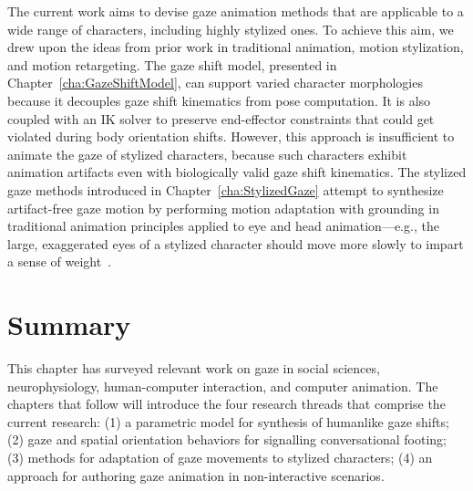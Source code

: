 The current work aims to devise gaze animation methods that are applicable to a wide range of characters, including highly stylized ones. To achieve this aim, we drew upon the ideas from prior work in traditional animation, motion stylization, and motion retargeting. The gaze shift model, presented in Chapter~\ref{cha:GazeShiftModel}, can support varied character morphologies because it decouples gaze shift kinematics from pose computation. It is also coupled with an IK solver to preserve end-effector constraints that could get violated during body orientation shifts. However, this approach is insufficient to animate the gaze of stylized characters, because such characters exhibit animation artifacts even with biologically valid gaze shift kinematics. The stylized gaze methods introduced in Chapter~\ref{cha:StylizedGaze} attempt to synthesize artifact-free gaze motion by performing motion adaptation with grounding in traditional animation principles applied to eye and head animation---e.g., the large, exaggerated eyes of a stylized character should move more slowly to impart a sense of weight~\citep{williams2009animator}.

\section{Summary}

This chapter has surveyed relevant work on gaze in social sciences, neurophysiology, human-computer interaction, and computer animation. The chapters that follow will introduce the four research threads that comprise the current research: (1) a parametric model for synthesis of humanlike gaze shifts; (2) gaze and spatial orientation behaviors for signalling conversational footing; (3) methods for adaptation of gaze movements to stylized characters; (4) an approach for authoring gaze animation in non-interactive scenarios. 
